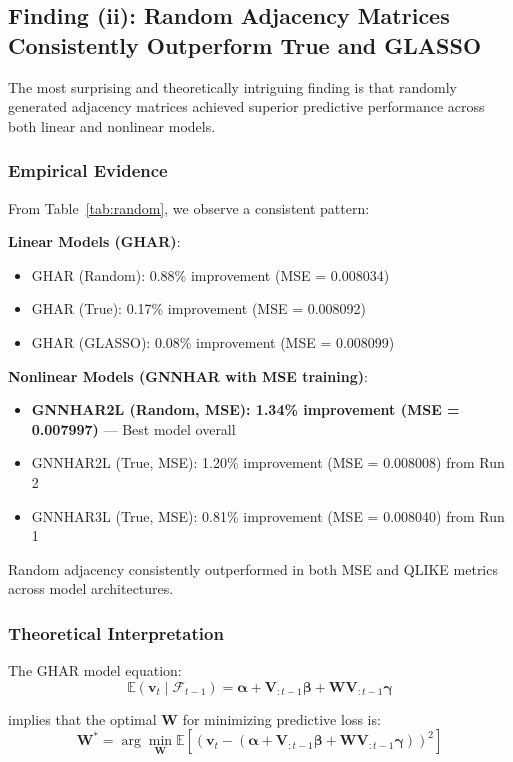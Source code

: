 \documentclass[10pt,a4paper]{article}
\newcommand{\E}{\mathbb{E}}
\newcommand{\bv}{\boldsymbol{v}}
\newcommand{\bV}{\boldsymbol{V}}
\newcommand{\bW}{\boldsymbol{W}}
\newcommand{\balpha}{\boldsymbol{\alpha}}
\newcommand{\bbeta}{\boldsymbol{\beta}}
\newcommand{\bgamma}{\boldsymbol{\gamma}}
\begin{document}
\subsection{Finding (ii): Random Adjacency Matrices Consistently Outperform True and GLASSO}

The most surprising and theoretically intriguing finding is that randomly generated adjacency matrices achieved superior predictive performance across both linear and nonlinear models.

\subsubsection{Empirical Evidence}

From Table~\ref{tab:random}, we observe a consistent pattern:

\textbf{Linear Models (GHAR)}:
\begin{itemize}
\item GHAR (Random): 0.88\% improvement (MSE = 0.008034)
\item GHAR (True): 0.17\% improvement (MSE = 0.008092)
\item GHAR (GLASSO): 0.08\% improvement (MSE = 0.008099)
\end{itemize}

\textbf{Nonlinear Models (GNNHAR with MSE training)}:
\begin{itemize}
\item \textbf{GNNHAR2L (Random, MSE): 1.34\% improvement (MSE = 0.007997)} --- Best model overall
\item GNNHAR2L (True, MSE): 1.20\% improvement (MSE = 0.008008) from Run 2
\item GNNHAR3L (True, MSE): 0.81\% improvement (MSE = 0.008040) from Run 1
\end{itemize}

Random adjacency consistently outperformed in both MSE and QLIKE metrics across model architectures.

\subsubsection{Theoretical Interpretation}

The GHAR model equation:
\begin{equation}
\E(\bv_t \mid \mathcal{F}_{t-1}) = \balpha + \bV_{:t-1} \bbeta + \bW \bV_{:t-1} \bgamma
\end{equation}

implies that the optimal $\bW$ for minimizing predictive loss is:
\begin{equation}
\bW^* = \arg\min_{\bW} \E\left[\left(\bv_t - (\balpha + \bV_{:t-1} \bbeta + \bW \bV_{:t-1} \bgamma)\right)^2\right]
\end{equation}
\end{document}
